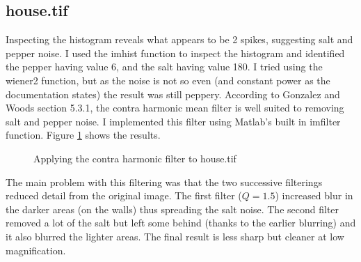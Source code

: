 \documentclass{article}
\begin{document}
\subsection*{house.tif}
Inspecting the histogram reveals what appears to be 2 spikes, suggesting salt and pepper noise. I used the imhist function to inspect the histogram and identified the pepper having value 6, and the salt having value 180. I tried using the wiener2 function, but as the noise is not so even (and constant power as the documentation states) the result was still peppery.
According to Gonzalez and Woods section 5.3.1, the contra harmonic mean filter is well suited to removing salt and pepper noise. I implemented this filter using Matlab's built in imfilter function. Figure \ref{q2:house} shows the results.
\begin{figure}[h]
\qquad
{}\qquad
{}
\caption{Applying the contra harmonic filter to house.tif}
\label{q2:house}
\end{figure}
The main problem with this filtering was that the two successive filterings reduced detail from the original image. The first filter ($Q=1.5$) increased blur in the darker areas (on the walls) thus spreading the salt noise. The second filter removed a lot of the salt but left some behind (thanks to the earlier blurring) and it also blurred the lighter areas. The final result is less sharp but cleaner at low magnification.
\end{document}
